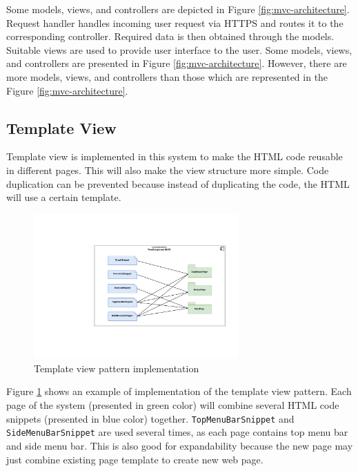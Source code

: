 Some models, views, and controllers are depicted in Figure \ref{fig:mvc-architecture}. Request handler handles incoming user request via HTTPS and routes it to the corresponding controller. Required data is then obtained through the models. Suitable views are used to provide user interface to the user. Some models, views, and controllers are presented in Figure \ref{fig:mvc-architecture}. However, there are more models, views, and controllers than those which are represented in the Figure \ref{fig:mvc-architecture}.

\clearpage
\subsection{Template View}
\label{sec:template-view}
Template view is implemented in this system to make the HTML code reusable in different pages. This will also make the view structure more simple. Code duplication can be prevented because instead of duplicating the code, the HTML will use a certain template.

\begin{figure}[H]
	\centering
	\includegraphics[width=0.7\textwidth]{7-software/images/template-view.pdf}
	\caption{Template view pattern implementation}
	\label{fig:template-view-architecture}
\end{figure}

Figure \ref{fig:template-view-architecture} shows an example of implementation of the template view pattern. Each page of the system (presented in green color) will combine several HTML code snippets (presented in blue color) together. \texttt{TopMenuBarSnippet} and \texttt{SideMenuBarSnippet} are used several times, as each page contains top menu bar and side menu bar. This is also good for expandability because the new page may just combine existing page template to create new web page.


